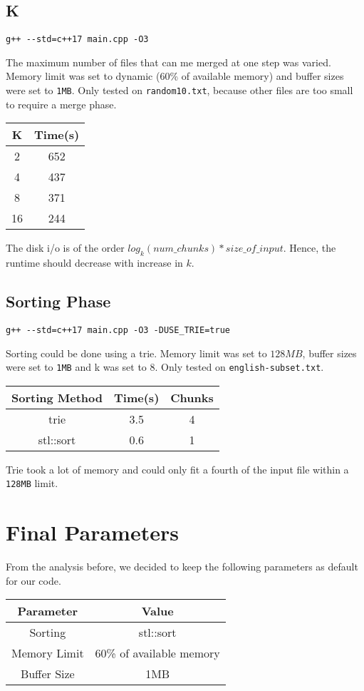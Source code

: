 \documentclass{article}
\begin{document}
\subsection{K}
\begin{lstlisting}[style = cpp]
g++ --std=c++17 main.cpp -O3
\end{lstlisting}
The maximum number of files that can me merged at one step was varied. Memory limit was set to dynamic (60\% of available memory) and buffer sizes were set to \verb|1MB|. Only tested on \verb|random10.txt|, because other files are too small to require a merge phase.
\begin{center}
\begin{tabular}{||c c||} 
 \hline
K & Time(s) \\ [0.5ex] 
 \hline\hline
 2 & 652 \\ 
 \hline
 4 & 437 \\
 \hline
 8 & 371\\ %
 \hline
 16 & 244\\ %
 \hline
\end{tabular}
\end{center}
The disk i/o is of the order $log_k(num\_chunks)*size\_of\_input$. Hence, the runtime should decrease with increase in $k$.
\subsection{Sorting Phase}
\begin{lstlisting}[style = cpp]
g++ --std=c++17 main.cpp -O3 -DUSE_TRIE=true
\end{lstlisting}
Sorting could be done using a trie. Memory limit was set to $128MB$, buffer sizes were set to \verb|1MB| and k was set to $8$. Only tested on \verb|english-subset.txt|.
\begin{center}
\begin{tabular}{||c c c||} 
 \hline
Sorting Method & Time(s) & Chunks \\ [0.5ex] 
 \hline\hline
 trie & 3.5 & 4\\ 
 \hline
 stl::sort & 0.6 &1\\ 
 \hline
\end{tabular}
\end{center}
Trie took a lot of memory and could only fit a fourth of the input file within a \verb|128MB| limit.
\section{Final Parameters}
From the analysis before, we decided to keep the following parameters as default for our code.
\begin{center}
\begin{tabular}{||c c||} 
 \hline
Parameter & Value \\ [0.5ex] 
 \hline\hline
 Sorting & stl::sort\\ 
 \hline
 Memory Limit & 60\% of available memory\\ 
 \hline
 Buffer Size & 1MB\\ 
 \hline
\end{tabular}
\end{center}
\end{document}
